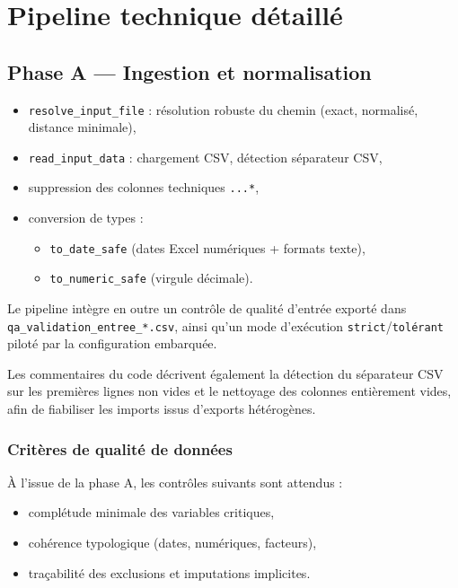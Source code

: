 \documentclass[11pt,a4paper]{article}
\begin{document}
\section{Pipeline technique d\'etaill\'e}
\subsection{Phase A --- Ingestion et normalisation}
\begin{itemize}[leftmargin=1.2cm]
  \item \texttt{resolve\_input\_file} : r\'esolution robuste du chemin (exact, normalis\'e, distance minimale),
  \item \texttt{read\_input\_data} : chargement CSV, d\'etection s\'eparateur CSV,
  \item suppression des colonnes techniques \texttt{...*},
  \item conversion de types :
  \begin{itemize}
    \item \texttt{to\_date\_safe} (dates Excel num\'eriques + formats texte),
    \item \texttt{to\_numeric\_safe} (virgule d\'ecimale).
  \end{itemize}
\end{itemize}

Le pipeline intègre en outre un contrôle de qualit\'e d'entr\'ee export\'e dans
\texttt{qa\_validation\_entree\_*.csv}, ainsi qu'un mode d'ex\'ecution
\texttt{strict}/\texttt{tol\'erant} pilot\'e par la configuration embarqu\'ee.

Les commentaires du code d\'ecrivent \'egalement la d\'etection du s\'eparateur CSV
sur les premières lignes non vides et le nettoyage des colonnes entièrement
vides, afin de fiabiliser les imports issus d'exports h\'et\'erogènes.

\subsubsection{Critères de qualit\'e de donn\'ees}
À l'issue de la phase A, les contrôles suivants sont attendus :
\begin{itemize}[leftmargin=1.2cm]
  \item compl\'etude minimale des variables critiques,
  \item coh\'erence typologique (dates, num\'eriques, facteurs),
  \item traçabilit\'e des exclusions et imputations implicites.
\end{itemize}
\end{document}
